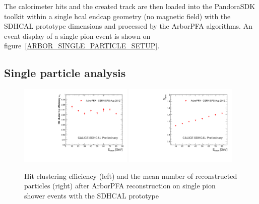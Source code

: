 \documentclass[cits]{JINST}
\begin{document}
The calorimeter hits and the created track are then loaded into the PandoraSDK toolkit \cite{pandora-sdk} within a single hcal endcap geometry (no magnetic field) with the SDHCAL prototype dimensions and processed by the ArborPFA algorithms. An event display of a single pion event is shown on figure~\ref{ARBOR_SINGLE_PARTICLE_SETUP}.

\subsection{Single particle analysis}

\begin{figure}[!h]
  \begin{center}
    \includegraphics[width=0.48\textwidth]{plots/SingleParticle_Efficiency.pdf}
    \includegraphics[width=0.48\textwidth]{plots/SingleParticle_NPfos.pdf} \\
  \end{center}
  \caption{\label{ARBOR_SINGLE_PARTICLE_EFFICIENCY_AND_NPFOS} Hit clustering efficiency (left) and the mean number of reconstructed particles (right) after ArborPFA reconstruction on single pion shower events with the SDHCAL prototype}
\end{figure}
\end{document}
